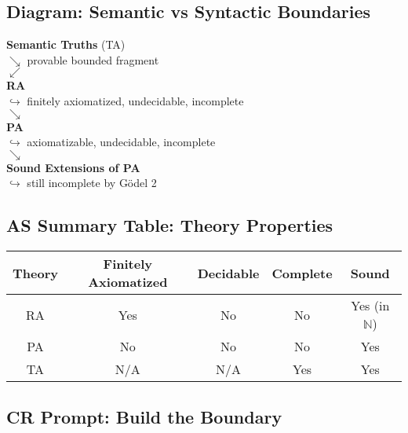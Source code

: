 \documentclass[12pt]{article}
\begin{document}
\subsection{Diagram: Semantic vs Syntactic Boundaries}

\vspace{1em}
\textbf{Semantic Truths} (TA)\\
\hspace{2em}$\searrow$ provable bounded fragment\\
\hspace{3em}$\swarrow$\\
\textbf{RA}\\
\hspace{1em}$\hookrightarrow$ finitely axiomatized, undecidable, incomplete\\
\hspace{2em}$\searrow$\\
\textbf{PA}\\
\hspace{1em}$\hookrightarrow$ axiomatizable, undecidable, incomplete\\
\hspace{2em}$\searrow$\\
\textbf{Sound Extensions of PA}\\
\hspace{1em}$\hookrightarrow$ still incomplete by Gödel 2\\
\vspace{1em}

\subsection*{AS Summary Table: Theory Properties}

\begin{center}
\begin{tabular}{|c|c|c|c|c|}
\hline
\textbf{Theory} & \textbf{Finitely Axiomatized} & \textbf{Decidable} & \textbf{Complete} & \textbf{Sound} \\
\hline
RA & Yes & No & No & Yes (in \( \mathbb{N} \)) \\
PA & No & No & No & Yes \\
TA & N/A & N/A & Yes & Yes \\
\hline
\end{tabular}
\end{center}

\subsection*{CR Prompt: Build the Boundary}
\end{document}
